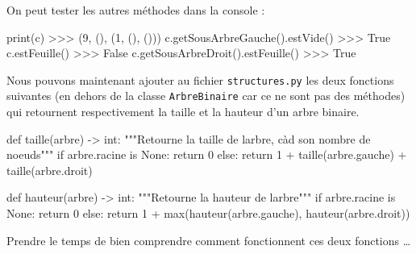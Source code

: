 \documentclass[
  a4paper,
  DIV=11,
  numbers=noendperiod]{scrartcl}
\newenvironment{Shaded}{\begin{snugshade}}{\end{snugshade}}
\newcommand{\BuiltInTok}[1]{\textcolor[rgb]{0.00,0.23,0.31}{#1}}
\newcommand{\CommentTok}[1]{\textcolor[rgb]{0.37,0.37,0.37}{#1}}
\newcommand{\ControlFlowTok}[1]{\textcolor[rgb]{0.00,0.23,0.31}{#1}}
\newcommand{\DecValTok}[1]{\textcolor[rgb]{0.68,0.00,0.00}{#1}}
\newcommand{\KeywordTok}[1]{\textcolor[rgb]{0.00,0.23,0.31}{#1}}
\newcommand{\NormalTok}[1]{\textcolor[rgb]{0.00,0.23,0.31}{#1}}
\newcommand{\OperatorTok}[1]{\textcolor[rgb]{0.37,0.37,0.37}{#1}}
\newcommand{\VariableTok}[1]{\textcolor[rgb]{0.07,0.07,0.07}{#1}}
\begin{document}
On peut tester les autres méthodes dans la console :

\begin{Shaded}
\begin{Highlighting}[]
\BuiltInTok{print}\NormalTok{(c)}
\OperatorTok{\textgreater{}\textgreater{}\textgreater{}}\NormalTok{ (}\DecValTok{9}\NormalTok{, (), (}\DecValTok{1}\NormalTok{, (), ()))}
\NormalTok{c.getSousArbreGauche().estVide()}
\OperatorTok{\textgreater{}\textgreater{}\textgreater{}} \VariableTok{True}
\NormalTok{c.estFeuille()}
\OperatorTok{\textgreater{}\textgreater{}\textgreater{}} \VariableTok{False}
\NormalTok{c.getSousArbreDroit().estFeuille()}
\OperatorTok{\textgreater{}\textgreater{}\textgreater{}} \VariableTok{True}
\end{Highlighting}
\end{Shaded}

Nous pouvons maintenant ajouter au fichier \texttt{structures.py} les
deux fonctions suivantes (en dehors de la classe \texttt{ArbreBinaire}
car ce ne sont pas des méthodes) qui retournent respectivement la taille
et la hauteur d'un arbre binaire.

\begin{Shaded}
\begin{Highlighting}[]
\KeywordTok{def}\NormalTok{ taille(arbre) }\OperatorTok{{-}\textgreater{}} \BuiltInTok{int}\NormalTok{:}
    \CommentTok{"""Retourne la taille de l\textquotesingle{}arbre, càd son nombre de noeuds"""}
    \ControlFlowTok{if}\NormalTok{ arbre.racine }\KeywordTok{is} \VariableTok{None}\NormalTok{:}
        \ControlFlowTok{return} \DecValTok{0}
    \ControlFlowTok{else}\NormalTok{:}
        \ControlFlowTok{return} \DecValTok{1} \OperatorTok{+}\NormalTok{ taille(arbre.gauche) }\OperatorTok{+}\NormalTok{ taille(arbre.droit)}

\KeywordTok{def}\NormalTok{ hauteur(arbre) }\OperatorTok{{-}\textgreater{}} \BuiltInTok{int}\NormalTok{:}
    \CommentTok{"""Retourne la hauteur de l\textquotesingle{}arbre"""}
    \ControlFlowTok{if}\NormalTok{ arbre.racine }\KeywordTok{is} \VariableTok{None}\NormalTok{:}
        \ControlFlowTok{return} \DecValTok{0}
    \ControlFlowTok{else}\NormalTok{:}
        \ControlFlowTok{return} \DecValTok{1} \OperatorTok{+} \BuiltInTok{max}\NormalTok{(hauteur(arbre.gauche), hauteur(arbre.droit))}
\end{Highlighting}
\end{Shaded}

Prendre le temps de bien comprendre comment fonctionnent ces deux
fonctions \ldots{}
\end{document}
